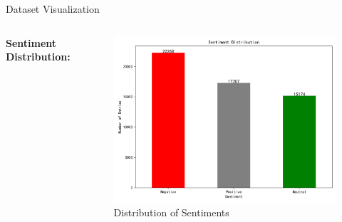 \documentclass[aspectratio=169]{beamer}
\begin{document}
\begin{frame}{Dataset Visualization}
  \begin{columns}[t]
      \textbf{Sentiment Distribution:}
      \begin{figure}
          \centering
          \includegraphics[width=\linewidth]{sentiment_distribution.png}
          \caption{Distribution of Sentiments}
      \end{figure}
  \end{columns}
\end{frame}
\end{document}
